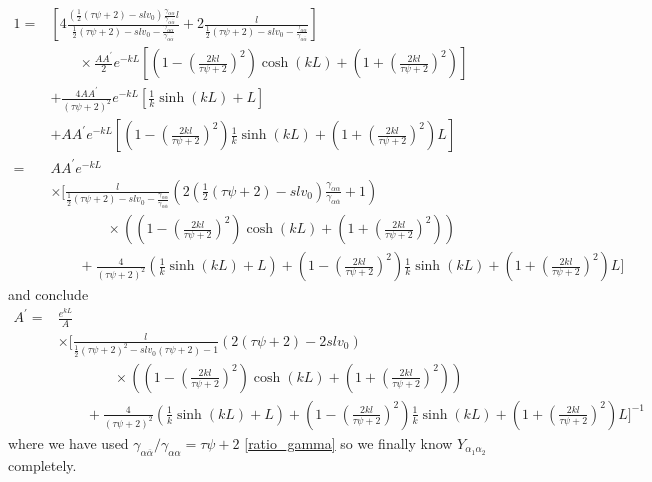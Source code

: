 \documentclass[pre,aps,superscriptaddress,nofootinbib]{revtex4}
\begin{document}
\begin{equation}
\begin{aligned}
1 = &\left[4 \frac{\left(\frac{1}{2}(\tau \psi + 2) - s l v_0\right) \frac{\gamma_{\alpha\alpha}}{\gamma_{\alpha\overline{\alpha}}} l}{\frac{1}{2}(\tau \psi + 2) - s l v_0 - \frac{\gamma_{\alpha\alpha}}{\gamma_{\alpha\overline{\alpha}}}} + 2 \frac{l}{\frac{1}{2}(\tau \psi + 2) - s l v_0 - \frac{\gamma_{\alpha\alpha}}{\gamma_{\alpha\overline{\alpha}}}}\right]\\
&\qquad \times \frac{A A^{\prime}}{2} e^{-k L} \left[\left(1 - \left(\frac{2 k l}{\tau \psi + 2}\right)^2\right) \cosh(k L) + \left(1 + \left(\frac{2 k l}{\tau \psi + 2}\right)^2\right)\right]\\
&+ \frac{4 A A^{\prime}}{(\tau \psi + 2)^2} e^{-k L} \left[\frac{1}{k}\sinh(kL) + L\right]\\
&+ A A^{\prime} e^{-k L} \left[\left(1 - \left(\frac{2 k l}{\tau \psi + 2}\right)^2\right) \frac{1}{k} \sinh(k L) + \left(1 + \left(\frac{2 k l}{\tau \psi + 2}\right)^2\right) L\right]\\
= & A A^{\prime} e^{-k L}\\
&\times\Bigg[\frac{l}{\frac{1}{2}(\tau \psi + 2) - s l v_0 - \frac{\gamma_{\alpha\alpha}}{\gamma_{\alpha\overline{\alpha}}}} \left(2 \left(\frac{1}{2} (\tau \psi + 2) - s l v_0\right) \frac{\gamma_{\alpha\alpha}}{\gamma_{\alpha\overline{\alpha}}} + 1\right)\\
&\qquad\qquad \times \left(\left(1 - \left(\frac{2 k l}{\tau \psi + 2}\right)^2\right) \cosh(k L) + \left(1 + \left(\frac{2 k l}{\tau \psi + 2}\right)^2\right)\right)\\
&\qquad + \frac{4}{(\tau \psi + 2)^2} \left(\frac{1}{k}\sinh(kL) + L\right) + \left(1 - \left(\frac{2 k l}{\tau \psi + 2}\right)^2\right) \frac{1}{k} \sinh(k L) + \left(1 + \left(\frac{2 k l}{\tau \psi + 2}\right)^2\right) L\Bigg]
\end{aligned}
\end{equation}
and conclude
\begin{equation}
\begin{aligned}
A^{\prime} =& \frac{e^{k L}}{A}\\
&\times\Bigg[\frac{l}{\frac{1}{2}(\tau \psi + 2)^2 - s l v_0 (\tau \psi + 2) - 1} \left(2 (\tau \psi + 2) - 2 s l v_0\right)\\
&\qquad\qquad \times \left(\left(1 - \left(\frac{2 k l}{\tau \psi + 2}\right)^2\right) \cosh(k L) + \left(1 + \left(\frac{2 k l}{\tau \psi + 2}\right)^2\right)\right)\\
&\qquad + \frac{4}{(\tau \psi + 2)^2} \left(\frac{1}{k}\sinh(kL) + L\right) + \left(1 - \left(\frac{2 k l}{\tau \psi + 2}\right)^2\right) \frac{1}{k} \sinh(k L) + \left(1 + \left(\frac{2 k l}{\tau \psi + 2}\right)^2\right) L\Bigg]^{-1}
\end{aligned}
\end{equation}
where we have used $\gamma_{\alpha\overline{\alpha}}/\gamma_{\alpha\alpha} = \tau \psi + 2$ \eqref{ratio_gamma} so we finally know $Y_{\alpha_1\alpha_2}$ completely.
\end{document}
